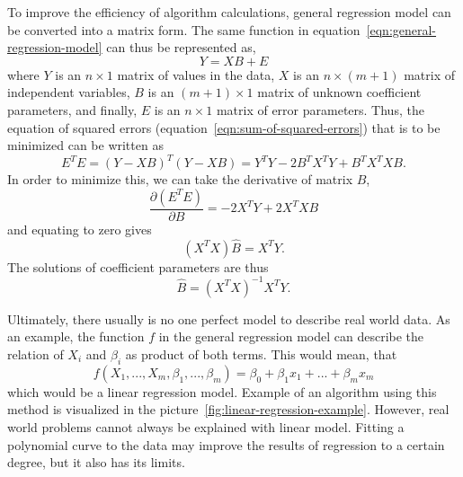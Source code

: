 To improve the efficiency of algorithm calculations,
general regression model can be converted into a matrix form.
The same function in equation~\ref{eqn:general-regression-model}
can thus be represented as,
\begin{equation}
    Y = XB+E
\end{equation}
where $Y$ is an $n\times1$ matrix of values in the data,
$X$ is an $n\times(m+1)$ matrix of independent variables,
$B$ is an $(m+1)\times1$ matrix of unknown coefficient parameters,
and finally, $E$ is an $n\times1$ matrix of error parameters.
Thus, the equation of squared errors (equation~\ref{eqn:sum-of-squared-errors})
that is to be minimized can be written as
\begin{equation}
    E^{T}E = (Y-XB)^{T}(Y-XB) = Y^{T}Y-2B^{T}X^{T}Y+B^{T}X^{T}XB.
\end{equation}
In order to minimize this, we can take the derivative of matrix $B$,
\begin{equation}
    \frac{\partial(E^{T}E)}{\partial B} = -2X^{T}Y + 2X^{T}XB
\end{equation}
and equating to zero gives
\begin{equation}
    (X^{T}X)\hat{B} = X^{T}Y.
\end{equation}
The solutions of coefficient parameters are thus
\begin{equation}
    \hat{B} = (X^{T}X)^{-1}X^{T}Y.
\end{equation}

Ultimately,
there usually is no one perfect model to describe real world data.
As an example,
the function $f$ in the general regression model
can describe the relation of $X_{i}$ and $\beta_{i}$ as product of both terms.
This would mean, that
\begin{equation}
    f(X_{1},...,X_{m},\beta_{1},...,\beta_{m})=\beta_{0}+\beta_{1}x_{1}+...+\beta_{m}x_{m}
\end{equation}
which would be a linear regression model.
Example of an algorithm using this method
is visualized in the picture~\ref{fig:linear-regression-example}.
However,
real world problems cannot always be explained with linear model.
Fitting a polynomial curve to the data
may improve the results of regression to a certain degree,
but it also has its limits.

